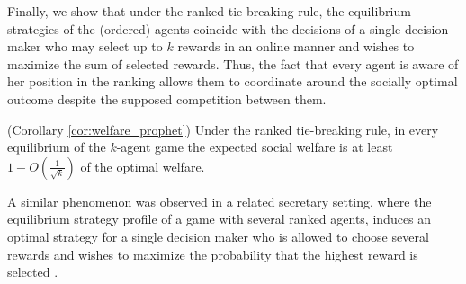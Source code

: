 Finally, we show that under the ranked tie-breaking rule, the equilibrium strategies of the (ordered) agents coincide with the decisions of a single decision maker who may select up to $k$ rewards in an online manner and wishes to maximize the sum of selected rewards.
Thus, the fact that every agent is aware of her position in the ranking allows them to coordinate around the socially optimal outcome despite the supposed competition between them.  
\begin{theorem*}(Corollary \ref{cor:welfare_prophet})
	Under the ranked tie-breaking rule, in every equilibrium of the $k$-agent game the expected social welfare is at least $1-O(\frac{1}{\sqrt{k}})$ of the optimal welfare.
\end{theorem*}

A similar phenomenon was observed in a related secretary setting, where the equilibrium strategy profile of a game with several ranked agents, induces an optimal strategy for a single decision maker who is allowed to choose several rewards and wishes to maximize the probability that the highest reward is selected \cite{matsui2016lower}. 


